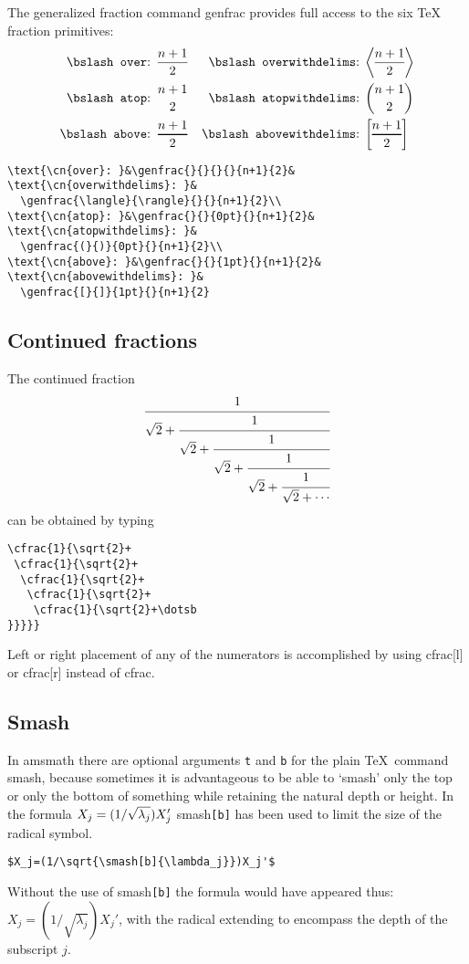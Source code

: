 \documentclass{article}
\newcommand{\ntt}{\normalfont\ttfamily}
\newcommand{\cn}[1]{{\protect\ntt\bslash#1}}
\newcommand{\pkg}[1]{{\protect\ntt#1}}
\theoremstyle{definition}
\theoremstyle{remark}
\begin{document}
The generalized fraction command \cn{genfrac} provides full access to
the six \TeX{} fraction primitives:
\begin{align}
\text{\cn{over}: }&\genfrac{}{}{}{}{n+1}{2}&
\text{\cn{overwithdelims}: }&
  \genfrac{\langle}{\rangle}{}{}{n+1}{2}\\
\text{\cn{atop}: }&\genfrac{}{}{0pt}{}{n+1}{2}&
\text{\cn{atopwithdelims}: }&
  \genfrac{(}{)}{0pt}{}{n+1}{2}\\
\text{\cn{above}: }&\genfrac{}{}{1pt}{}{n+1}{2}&
\text{\cn{abovewithdelims}: }&
  \genfrac{[}{]}{1pt}{}{n+1}{2}
\end{align}
\begin{verbatim}
\text{\cn{over}: }&\genfrac{}{}{}{}{n+1}{2}&
\text{\cn{overwithdelims}: }&
  \genfrac{\langle}{\rangle}{}{}{n+1}{2}\\
\text{\cn{atop}: }&\genfrac{}{}{0pt}{}{n+1}{2}&
\text{\cn{atopwithdelims}: }&
  \genfrac{(}{)}{0pt}{}{n+1}{2}\\
\text{\cn{above}: }&\genfrac{}{}{1pt}{}{n+1}{2}&
\text{\cn{abovewithdelims}: }&
  \genfrac{[}{]}{1pt}{}{n+1}{2}
\end{verbatim}

\subsection{Continued fractions}
The continued fraction
\begin{equation}
\cfrac{1}{\sqrt{2}+
 \cfrac{1}{\sqrt{2}+
  \cfrac{1}{\sqrt{2}+
   \cfrac{1}{\sqrt{2}+
    \cfrac{1}{\sqrt{2}+\dotsb
}}}}}
\end{equation}
can be obtained by typing
\begin{verbatim}
\cfrac{1}{\sqrt{2}+
 \cfrac{1}{\sqrt{2}+
  \cfrac{1}{\sqrt{2}+
   \cfrac{1}{\sqrt{2}+
    \cfrac{1}{\sqrt{2}+\dotsb
}}}}}
\end{verbatim}
Left or right placement of any of the numerators is accomplished by using
\cn{cfrac[l]} or \cn{cfrac[r]} instead of \cn{cfrac}.

\subsection{Smash}

In \pkg{amsmath} there are optional arguments \verb"t" and \verb"b" for
the plain \TeX\ command \cn{smash}, because sometimes it is advantageous
to be able to `smash' only the top or only the bottom of something while
retaining the natural depth or height. In the formula
$X_j=(1/\sqrt{\smash[b]{\lambda_j}})X_j'$ \cn{smash}\verb=[b]= has been
used to limit the size of the radical symbol.
\begin{verbatim}
$X_j=(1/\sqrt{\smash[b]{\lambda_j}})X_j'$
\end{verbatim}
Without the use of \cn{smash}\verb=[b]= the formula would have appeared
thus: $X_j=(1/\sqrt{\lambda_j})X_j'$, with the radical extending to
encompass the depth of the subscript $j$.
\end{document}
